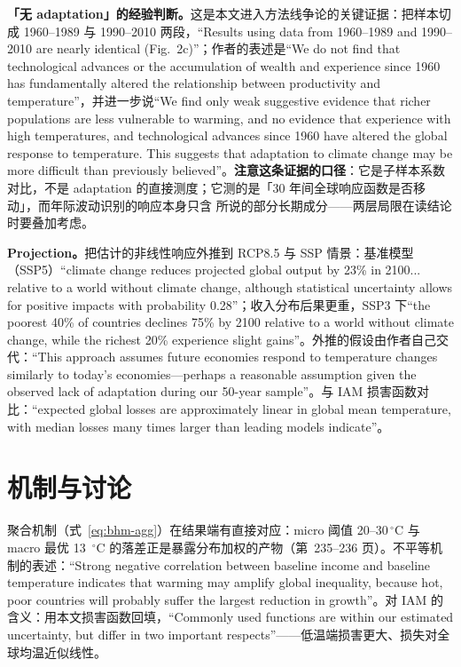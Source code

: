 \textbf{「无 adaptation」的经验判断。}这是本文进入方法线争论的关键证据：把样本切成 1960--1989 与 1990--2010 两段，``Results using data from 1960–1989 and 1990–2010 are nearly identical (Fig.~2c)''\citep[第~237 页]{burke2015global}；作者的表述是``We do not find that technological advances or the accumulation of wealth and experience since 1960 has fundamentally altered the relationship between productivity and temperature''\citep[第~237 页]{burke2015global}，并进一步说``We find only weak suggestive evidence that richer populations are less vulnerable to warming, and no evidence that experience with high temperatures, and technological advances since 1960 have altered the global response to temperature. This suggests that adaptation to climate change may be more difficult than previously believed''\citep[第~237 页]{burke2015global}。\textbf{注意这条证据的口径}：它是子样本系数对比，不是 adaptation 的直接测度；它测的是「30 年间全球响应函数是否移动」，而年际波动识别的响应本身只含  所说的部分长期成分——两层局限在读结论时要叠加考虑。

\textbf{Projection。}把估计的非线性响应外推到 RCP8.5 与 SSP 情景：基准模型（SSP5）``climate change reduces projected global output by 23\% in 2100... relative to a world without climate change, although statistical uncertainty allows for positive impacts with probability 0.28''\citep[第~238 页]{burke2015global}；收入分布后果更重，SSP3 下``the poorest 40\% of countries declines 75\% by 2100 relative to a world without climate change, while the richest 20\% experience slight gains''\citep[第~238 页]{burke2015global}。外推的假设由作者自己交代：``This approach assumes future economies respond to temperature changes similarly to today's economies—perhaps a reasonable assumption given the observed lack of adaptation during our 50-year sample''\citep[第~237 页]{burke2015global}。与 IAM 损害函数对比：``expected global losses are approximately linear in global mean temperature, with median losses many times larger than leading models indicate''\citep[摘要，第~235 页]{burke2015global}。

\section{机制与讨论}

聚合机制（式~\ref{eq:bhm-agg}）在结果端有直接对应：micro 阈值 20--30\,$^\circ$C 与 macro 最优 13~$^\circ$C 的落差正是暴露分布加权的产物（第~235--236 页）。不平等机制的表述：``Strong negative correlation between baseline income and baseline temperature indicates that warming may amplify global inequality, because hot, poor countries will probably suffer the largest reduction in growth''\citep[第~238 页]{burke2015global}。对 IAM 的含义：用本文损害函数回填，``Commonly used functions are within our estimated uncertainty, but differ in two important respects''\citep[第~238 页]{burke2015global}——低温端损害更大、损失对全球均温近似线性。

